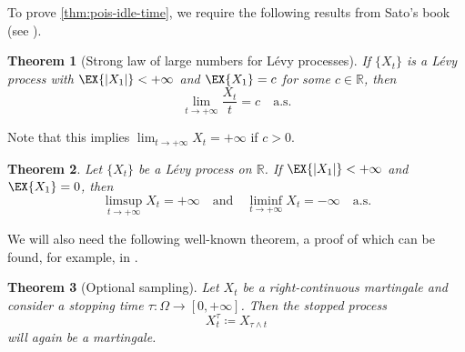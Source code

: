 \documentclass[titlepage]{article}
\theoremstyle{plain}
\newtheorem{theorem}{Theorem}[section]
\theoremstyle{definition}
\begin{document}
To prove \cref{thm:pois-idle-time}, we require the following results from Sato's book (see \cite[Theorem 36.5 and Theorem 36.7]{sato}).

\begin{theorem}[Strong law of large numbers for Lévy processes] \label{thm:lln-levy}
  If $\{ X_t \}$ is a L\'evy process with $\EX{\vert X_1 \vert} < +\infty$ and $\EX{X_1} = c$ for some $c \in \mathbb{R}$, then
  \begin{equation}
    \lim_{t \to +\infty} \frac{X_t}{t} = c \quad \mathrm{a.s.}
  \end{equation}
\end{theorem}

Note that this implies $\lim_{t \to +\infty} X_t = +\infty$ if $c > 0$.

\begin{theorem} \label{thm:recurrent}
  Let $\{ X_t \}$ be a L\'evy process on $\mathbb{R}$. If $\EX{\vert X_1 \vert} < +\infty$ and $\EX{X_1} = 0$, then
  \begin{equation}
    \limsup_{t \to +\infty} X_t = +\infty \quad \mathrm{and} \quad \liminf_{t \to +\infty} X_t = -\infty \quad \mathrm{a.s.}
  \end{equation}
\end{theorem}

We will also need the following well-known theorem, a proof of which can be found, for example, in \cite[Theorem 3.2 and Corollary 3.6]{revuz}.

\begin{theorem}[Optional sampling] \label{thm:opt-samp}
  Let $X_t$ be a right-continuous martingale and consider a stopping time $\tau: \Omega \rightarrow [0, +\infty]$. Then the \emph{stopped process}
  \begin{equation}
    X^\tau_t \coloneqq X_{\tau \wedge t}
  \end{equation}
  will again be a martingale.
\end{theorem}
\end{document}
